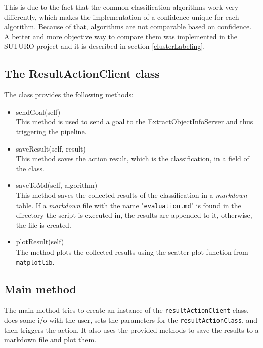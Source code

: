 \documentclass[main.tex]{subfiles}
\begin{document}
This is due to the fact that the common classification algorithms work very differently, which makes the implementation of a confidence unique for each algorithm. Because of that, algorithms are not comparable based on confidence. A better and more objective way to compare them was implemented in the SUTURO project and it is described in section \ref{clusterLabeling}.


 

\subsection{The ResultActionClient class}
The class provides the following methods:

\begin{itemize}
\item 
sendGoal(self)\\
This method is used to send a goal to the ExtractObjectInfoServer and thus triggering the pipeline.

\item saveResult(self, result)\\
This method saves the action result, which is the classification, in a field of the class.

\item saveToMd(self, algorithm)\\
This method saves the collected results of the classification in a \textit{markdown} table. If a \textit{markdown} file with the name "\texttt{evaluation.md}" is found in the directory the script is executed in, the results are appended to it, otherwise, the file is created.

\item plotResult(self)\\
The method plots the collected results using the scatter plot function from \texttt{matplotlib}.
\end{itemize}

\subsection{Main method}
The main method tries to create an instance of the \texttt{resultActionClient} class, does some i/o with the user, sets the parameters for the \texttt{resultActionClass}, and then triggers the action. It also uses the provided methods to save the results to a markdown file and plot them.
\end{document}
